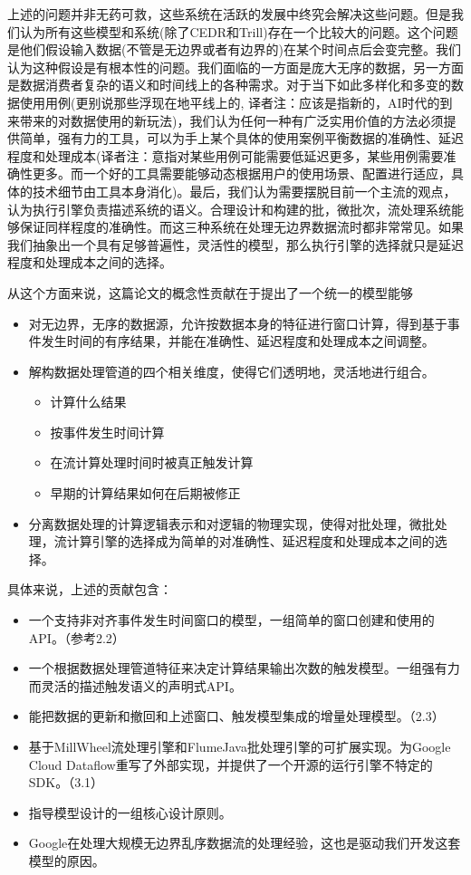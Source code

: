\documentclass[oneside]{ctexbook}
\begin{document}
上述的问题并非无药可救，这些系统在活跃的发展中终究会解决这些问题。但是我们认为所有这些模型和系统(除了CEDR和Trill)存在一个比较大的问题。这个问题是他们假设输入数据(不管是无边界或者有边界的)在某个时间点后会变完整。我们认为这种假设是有根本性的问题。我们面临的一方面是庞大无序的数据，另一方面是数据消费者复杂的语义和时间线上的各种需求。对于当下如此多样化和多变的数据使用用例(更别说那些浮现在地平线上的, 译者注：应该是指新的，AI时代的到来带来的对数据使用的新玩法)，我们认为任何一种有广泛实用价值的方法必须提供简单，强有力的工具，可以为手上某个具体的使用案例平衡数据的准确性、延迟程度和处理成本(译者注：意指对某些用例可能需要低延迟更多，某些用例需要准确性更多。而一个好的工具需要能够动态根据用户的使用场景、配置进行适应，具体的技术细节由工具本身消化)。最后，我们认为需要摆脱目前一个主流的观点，认为执行引擎负责描述系统的语义。合理设计和构建的批，微批次，流处理系统能够保证同样程度的准确性。而这三种系统在处理无边界数据流时都非常常见。如果我们抽象出一个具有足够普遍性，灵活性的模型，那么执行引擎的选择就只是延迟程度和处理成本之间的选择。

从这个方面来说，这篇论文的概念性贡献在于提出了一个统一的模型能够

\begin{itemize}
\item 对无边界，无序的数据源，允许按数据本身的特征进行窗口计算，得到基于事件发生时间的有序结果，并能在准确性、延迟程度和处理成本之间调整。
\item 解构数据处理管道的四个相关维度，使得它们透明地，灵活地进行组合。

\begin{itemize}
\item 计算什么结果
\item 按事件发生时间计算
\item 在流计算处理时间时被真正触发计算
\item 早期的计算结果如何在后期被修正
\end{itemize}

\item 分离数据处理的计算逻辑表示和对逻辑的物理实现，使得对批处理，微批处理，流计算引擎的选择成为简单的对准确性、延迟程度和处理成本之间的选择。

\end{itemize}

具体来说，上述的贡献包含：

\begin{itemize}

\item 一个支持非对齐事件发生时间窗口的模型，一组简单的窗口创建和使用的API。（参考2.2）
\item 一个根据数据处理管道特征来决定计算结果输出次数的触发模型。一组强有力而灵活的描述触发语义的声明式API。
\item 能把数据的更新和撤回和上述窗口、触发模型集成的增量处理模型。（2.3）
\item 基于MillWheel流处理引擎和FlumeJava批处理引擎的可扩展实现。为Google Cloud Dataflow重写了外部实现，并提供了一个开源的运行引擎不特定的SDK。（3.1）
\item 指导模型设计的一组核心设计原则。
\item Google在处理大规模无边界乱序数据流的处理经验，这也是驱动我们开发这套模型的原因。

\end{itemize}
\end{document}
